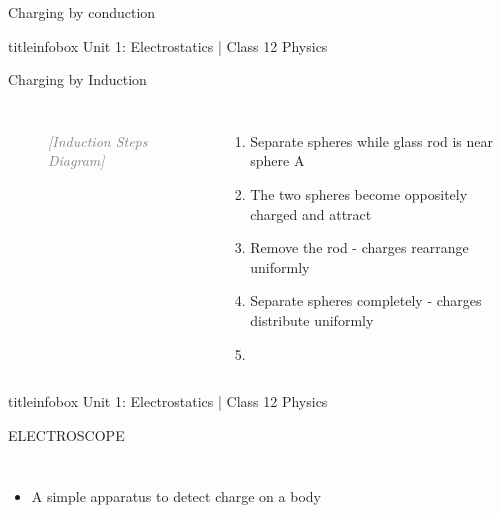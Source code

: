 \begin{frame}
\begin{frame}{Charging by conduction}
    \begin{beamercolorbox}[wd=\textwidth,ht=0.5cm,dp=0.1cm,center]{titleinfobox}
        \small\color{coolgray} Unit 1: Electrostatics | Class 12 Physics
    \end{beamercolorbox}
\end{frame}


\begin{frame}{Charging by Induction}
    \begin{columns}
        \begin{figure}[h]
            \centering
            \textcolor{gray}{\textit{[Induction Steps Diagram]}}
        \end{figure}
        
        \begin{enumerate}
            \item[iii)] Separate spheres while glass rod is near sphere A
            
            \item The two spheres become oppositely charged and attract
            
            \item[iv)] Remove the rod - charges rearrange uniformly
            
            \item[v)] Separate spheres completely - charges distribute uniformly
            
            \item {}
        \end{enumerate}
    \end{columns}
    
    \vfill
    
    \begin{beamercolorbox}[wd=\textwidth,ht=0.5cm,dp=0.1cm,center]{titleinfobox}
        \small\color{coolgray} Unit 1: Electrostatics | Class 12 Physics
    \end{beamercolorbox}
\end{frame}

\begin{frame}{ELECTROSCOPE}
    \begin{columns}
        \begin{itemize}
        \item A simple apparatus to detect charge on a body
            

\end{itemize}
\end{columns}
\end{frame}
\end{frame}
